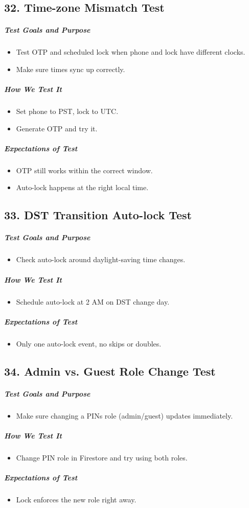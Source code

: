 \subsection*{32. Time-zone Mismatch Test}
\subparagraph{Test Goals and Purpose}
\begin{itemize}
    \item Test OTP and scheduled lock when phone and lock have different clocks.
    \item Make sure times sync up correctly.
\end{itemize}
\subparagraph{How We Test It}
\begin{itemize}
    \item Set phone to PST, lock to UTC.
    \item Generate OTP and try it.
\end{itemize}
\subparagraph{Expectations of Test}
\begin{itemize}
    \item OTP still works within the correct window.
    \item Auto-lock happens at the right local time.
\end{itemize}

\subsection*{33. DST Transition Auto-lock Test}
\subparagraph{Test Goals and Purpose}
\begin{itemize}
    \item Check auto-lock around daylight-saving time changes.
\end{itemize}
\subparagraph{How We Test It}
\begin{itemize}
    \item Schedule auto-lock at 2 AM on DST change day.
\end{itemize}
\subparagraph{Expectations of Test}
\begin{itemize}
    \item Only one auto-lock event, no skips or doubles.
\end{itemize}

\subsection*{34. Admin vs. Guest Role Change Test}
\subparagraph{Test Goals and Purpose}
\begin{itemize}
    \item Make sure changing a PINs role (admin/guest) updates immediately.
\end{itemize}
\subparagraph{How We Test It}
\begin{itemize}
    \item Change PIN role in Firestore and try using both roles.
\end{itemize}
\subparagraph{Expectations of Test}
\begin{itemize}
    \item Lock enforces the new role right away.
\end{itemize}

